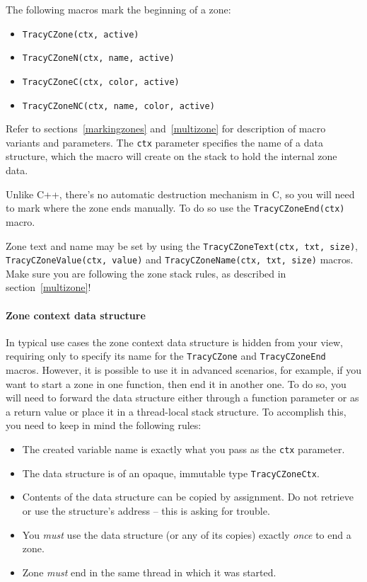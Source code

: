\documentclass[hidelinks,titlepage,a4paper]{article}
\begin{document}
The following macros mark the beginning of a zone:

\begin{itemize}
\item \texttt{TracyCZone(ctx, active)}
\item \texttt{TracyCZoneN(ctx, name, active)}
\item \texttt{TracyCZoneC(ctx, color, active)}
\item \texttt{TracyCZoneNC(ctx, name, color, active)}
\end{itemize}

Refer to sections~\ref{markingzones} and~\ref{multizone} for description of macro variants and parameters. The \texttt{ctx} parameter specifies the name of a data structure, which the macro will create on the stack to hold the internal zone data.

Unlike C++, there's no automatic destruction mechanism in C, so you will need to mark where the zone ends manually. To do so use the \texttt{TracyCZoneEnd(ctx)} macro.

Zone text and name may be set by using the \texttt{TracyCZoneText(ctx, txt, size)}, \texttt{TracyCZoneValue(ctx, value)} and \texttt{TracyCZoneName(ctx, txt, size)} macros. Make sure you are following the zone stack rules, as described in section~\ref{multizone}!

\paragraph{Zone context data structure}
\label{zonectx}

In typical use cases the zone context data structure is hidden from your view, requiring only to specify its name for the \texttt{TracyCZone} and \texttt{TracyCZoneEnd} macros. However, it is possible to use it in advanced scenarios, for example, if you want to start a zone in one function, then end it in another one. To do so, you will need to forward the data structure either through a function parameter or as a return value or place it in a thread-local stack structure. To accomplish this, you need to keep in mind the following rules:

\begin{itemize}
\item The created variable name is exactly what you pass as the \texttt{ctx} parameter.
\item The data structure is of an opaque, immutable type \texttt{TracyCZoneCtx}.
\item Contents of the data structure can be copied by assignment. Do not retrieve or use the structure's address -- this is asking for trouble.
\item You \emph{must} use the data structure (or any of its copies) exactly \emph{once} to end a zone.
\item Zone \emph{must} end in the same thread in which it was started.
\end{itemize}
\end{document}
